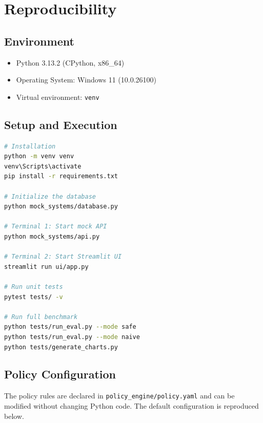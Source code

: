 \documentclass[11pt,a4paper]{article}
\begin{document}
\appendix

\section{Reproducibility}

\subsection{Environment}

\begin{itemize}[leftmargin=*, itemsep=2pt]
    \item Python 3.13.2 (CPython, x86\_64)
    \item Operating System: Windows 11 (10.0.26100)
    \item Virtual environment: \texttt{venv}
\end{itemize}

\subsection{Setup and Execution}

\begin{lstlisting}[language=bash, caption={Installation and execution commands.}]
# Installation
python -m venv venv
venv\Scripts\activate
pip install -r requirements.txt

# Initialize the database
python mock_systems/database.py

# Terminal 1: Start mock API
python mock_systems/api.py

# Terminal 2: Start Streamlit UI
streamlit run ui/app.py

# Run unit tests
pytest tests/ -v

# Run full benchmark
python tests/run_eval.py --mode safe
python tests/run_eval.py --mode naive
python tests/generate_charts.py
\end{lstlisting}

\subsection{Policy Configuration}

The policy rules are declared in \texttt{policy\_engine/policy.yaml} and can be modified without changing Python code. The default configuration is reproduced below.
\end{document}
